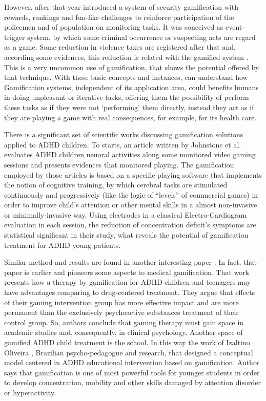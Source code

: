 However, after that year introduced a system of security gamification with rewards, rankings and fun-like challenges to reinforce participation of the policemen and of population on monitoring tasks. It was conceived as event-trigger system, by which some criminal occurrence or suspecting acts are regard as a game. Some reduction in violence taxes are registered after that and, according some evidences, this reduction is related with the gamified system \citep{conf/cts/Aud13}. This is a very uncommon use of gamification, that shows the potential offered by that technique. With these basic concepts and instances,  can understand how Gamification systems, independent of its application area, could benefits humans in doing unpleasant or iterative tasks, offering them the possibility of perform these tasks as if they were not `performing' them directly, instead they act as if they are playing a game with real consequences, for example, for its health care.

There is a significant set of scientific works discussing gamification solutions applied to ADHD children. To starts, an article written by Johnstone et al. \citep{Johnstone-2013} evaluates ADHD children neuoral activities along some monitored video gaming sessions and presents evidences that monitored playing. The gamification employed by those articles is based on a specific playing software  that implements the notion of cognitive training, by which cerebral tasks are stimulated continuously and progressively (like the logic of ``levels'' of commercial games) in order to improve child's attention or other mental skills in a almost non-invasive or minimally-invasive way.  Using electrodes in a classical Electro-Cardiogram evaluation in each session, the reduction of concentration deficit's symptoms are statistical significant in their study, what reveals the potential of gamification treatment for ADHD young patients.

Similar method and results are found in another interesting paper \citep{Nemeth}. In fact, that paper is earlier and pioneers some aspects to medical gamification. That work  presents how a therapy by gamification for ADHD children and teenagers may have advantages comparing to drug-centered treatment. They argue that effects of their gaming intervention group has more effective impact and are more permanent than the exclusively psychoactive substances treatment of their control group. So, authors conclude that gaming therapy must gain space in academic studies and, consequently, in clinical psychology. Another space of gamified ADHD child treatment is the school. In this way the work of Izaltino Oliveira \citep{Oliveira}, Brazilian psycho-pedagogue and research, that designed a conceptual model centered in ADHD educational intervention based on gamification. Author says that gamification is one of most powerful tools for younger students in order to develop concentration, mobility and other skills damaged by attention disorder or hyperactivity.

